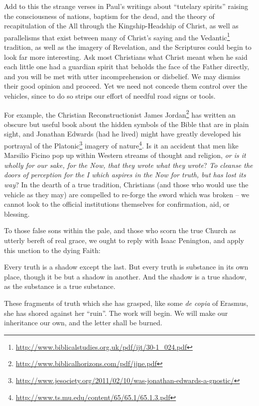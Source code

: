 Add to this the strange verses in Paul's writings about ``tutelary spirits'' raising the consciousness of nations, baptism for the dead, and the theory of recapitulation of the All through the Kingship-Headship of Christ, as well as parallelisms that exist between many of Christ's saying and the Vedantic\footnote{\url{http://www.biblicalstudies.org.uk/pdf/ijt/30-1_024.pdf}} tradition, as well as the imagery of Revelation, and the Scriptures could begin to look far more interesting. Ask most Christians what Christ meant when he said each little one had a guardian spirit that beholds the face of the Father directly, and you will be met with utter incomprehension or disbelief. We may dismiss their good opinion and proceed. Yet we need not concede them control over the vehicles, since to do so strips our effort of needful road signs or tools.

For example, the Christian Reconstructionist James Jordan\footnote{\url{http://www.biblicalhorizons.com/pdf/jjne.pdf}} has written an obscure but useful book about the hidden symbols of the Bible that are in plain sight, and Jonathan Edwards (had he lived) might have greatly developed his portrayal of the Platonic\footnote{\url{http://www.jesociety.org/2011/02/10/was-jonathan-edwards-a-gnostic/}} imagery of nature\footnote{\url{http://www.ts.mu.edu/content/65/65.1/65.1.3.pdf}}. Is it an accident that men like Marsilio Ficino pop up within Western streams of thought and religion, \emph{or is it wholly for our sake, for the Now, that they wrote what they wrote}? \emph{To cleanse the doors of perception for the I which aspires in the Now for truth, but has lost its way}? In the dearth of a true tradition, Christians (and those who would use the vehicle as they may) are compelled to re-forge the sword which was broken -- we cannot look to the official institutions themselves for confirmation, aid, or blessing.

To those false sons within the pale, and those who scorn the true Church as utterly bereft of real grace, we ought to reply with Isaac Penington, and apply this unction to the dying Faith:

\begin{quotex}
Every truth is a shadow except the last. But every truth is substance in its own place, though it be but a shadow in another. And the shadow is a true shadow, as the substance is a true substance.
\end{quotex}


These fragments of truth which she has grasped, like some \emph{de copia} of Erasmus, she has shored against her ``ruin''. The work will begin. We will make our inheritance our own, and the letter shall be burned.


